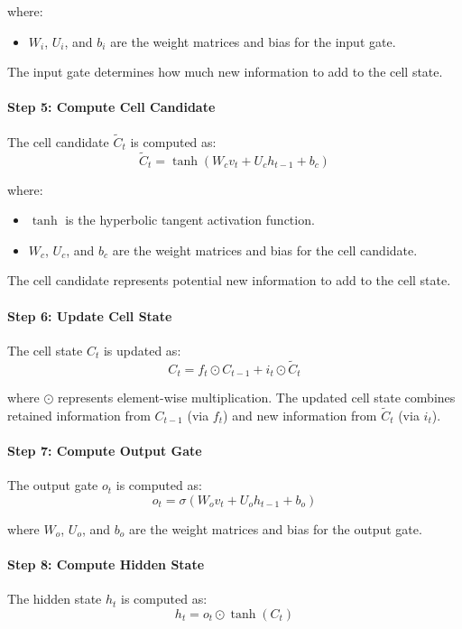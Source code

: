 \documentclass[12pt,a4paper]{article}
\begin{document}
where:
\begin{itemize}
    \item $W_i$, $U_i$, and $b_i$ are the weight matrices and bias for the input gate.
\end{itemize}
The input gate determines how much new information to add to the cell state.

\paragraph{Step 5: Compute Cell Candidate}
The cell candidate $\tilde{C}_t$ is computed as:
\begin{equation}
    \tilde{C}_t = \tanh(W_c v_t + U_c h_{t-1} + b_c)
\end{equation}

where:
\begin{itemize}
    \item $\tanh$ is the hyperbolic tangent activation function.
    \item $W_c$, $U_c$, and $b_c$ are the weight matrices and bias for the cell candidate.
\end{itemize}
The cell candidate represents potential new information to add to the cell state.

\paragraph{Step 6: Update Cell State}
The cell state $C_t$ is updated as:
\begin{equation}
    C_t = f_t \odot C_{t-1} + i_t \odot \tilde{C}_t
\end{equation}

where $\odot$ represents element-wise multiplication. The updated cell state combines retained information from $C_{t-1}$ (via $f_t$) and new information from $\tilde{C}_t$ (via $i_t$).

\paragraph{Step 7: Compute Output Gate}
The output gate $o_t$ is computed as:
\begin{equation}
    o_t = \sigma(W_o v_t + U_o h_{t-1} + b_o)
\end{equation}

where $W_o$, $U_o$, and $b_o$ are the weight matrices and bias for the output gate.

\paragraph{Step 8: Compute Hidden State}
The hidden state $h_t$ is computed as:
\begin{equation}
    h_t = o_t \odot \tanh(C_t)
\end{equation}
\end{document}
